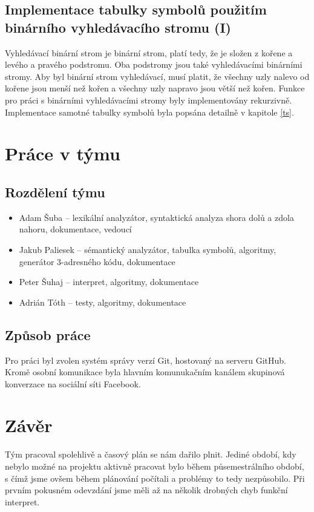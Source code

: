 \documentclass[a4paper, 11pt]{article}
\begin{document}
    \subsection{Implementace tabulky symbolů použitím binárního vyhledávacího stromu (I)}
    Vyhledávací binární strom je binární strom, platí tedy, že je složen z kořene a levého a pravého podstromu. Oba podstromy jsou také vyhledávacími binárními stromy. Aby byl binární strom vyhledávací, musí platit, že všechny uzly nalevo od kořene jsou menší než kořen a všechny uzly napravo jsou větší než kořen. Funkce pro práci s binárními vyhledávacími stromy byly implementovány rekurzivně. Implementace samotné tabulky symbolů byla popsána detailně v kapitole \ref{ts}.
    \section{Práce v týmu}
    \subsection{Rozdělení týmu}
    \begin{itemize}
        \item Adam Šuba – lexikální analyzátor, syntaktická analyza shora dolů a zdola nahoru, dokumentace, vedoucí
        \item Jakub Paliesek – sémantický analyzátor, tabulka symbolů, algoritmy, generátor 3-adresného kódu, dokumentace
        \item Peter Šuhaj – interpret, algoritmy, dokumentace
        \item Adrián Tóth – testy, algoritmy, dokumentace
    \end{itemize}
    \subsection{Způsob práce}
    Pro práci byl zvolen systém správy verzí Git, hostovaný na serveru GitHub. Kromě osobní komunikace byla hlavním komunukačním kanálem skupinová konverzace na sociální síti Facebook.
    \section{Závěr}
    Tým pracoval spolehlivě a časový plán se nám dařilo plnit. Jediné období, kdy nebylo možné na projektu aktivně pracovat bylo během půsemestrálního období, s čímž jsme ovšem během plánování počítali a problémy to tedy nezpůsobilo. Při prvním pokusném odevzdání jsme měli až na několik drobných chyb funkční interpret.
\end{document}
